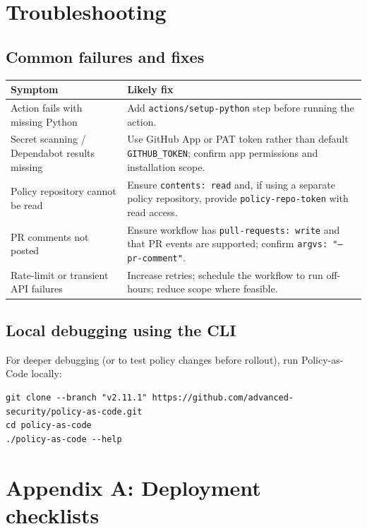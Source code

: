 \documentclass[11pt]{article}
\renewcommand{\cmd}[1]{\texttt{#1}}
\begin{document}
\section{Troubleshooting}

\subsection{Common failures and fixes}

\begin{longtable}{@{}p{}p{}@{}}
\toprule
Symptom & Likely fix \\
\midrule
Action fails with missing Python & Add \cmd{actions/setup-python} step before running the action. \\
Secret scanning / Dependabot results missing & Use GitHub App or PAT token rather than default \cmd{GITHUB\_TOKEN}; confirm app permissions and installation scope. \\
Policy repository cannot be read & Ensure \cmd{contents: read} and, if using a separate policy repository, provide \cmd{policy-repo-token} with read access. \\
PR comments not posted & Ensure workflow has \cmd{pull-requests: write} and that PR events are supported; confirm \cmd{argvs: "--pr-comment"}. \\
Rate-limit or transient API failures & Increase retries; schedule the workflow to run off-hours; reduce scope where feasible. \\
\bottomrule
\end{longtable}

\subsection{Local debugging using the CLI}

For deeper debugging (or to test policy changes before rollout), run Policy-as-Code locally:
\begin{lstlisting}[style=ghascode]
git clone --branch "v2.11.1" https://github.com/advanced-security/policy-as-code.git
cd policy-as-code
./policy-as-code --help
\end{lstlisting}

\section{Appendix A: Deployment checklists}
\end{document}

